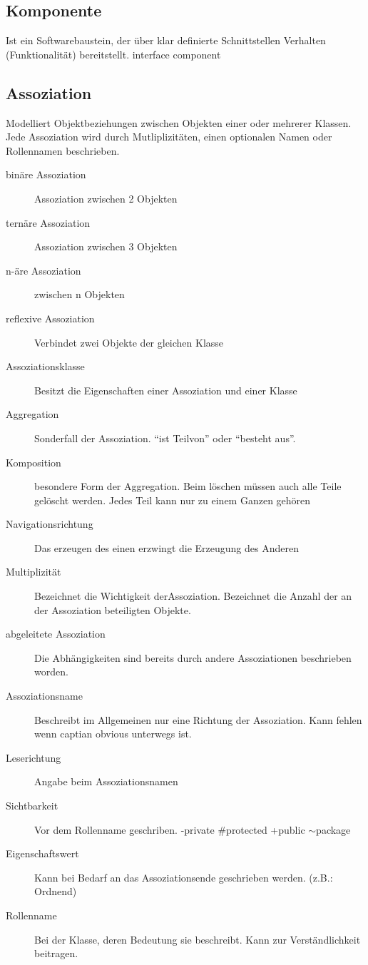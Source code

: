	
\subsection{Komponente}
	Ist ein Softwarebaustein, der über klar definierte Schnittstellen Verhalten
	(Funktionalität) bereitstellt.
	interface
	component

\subsection{Assoziation}
	Modelliert Objektbeziehungen zwischen Objekten einer oder mehrerer Klassen.
	Jede Assoziation wird durch Mutliplizitäten, einen optionalen Namen oder Rollennamen
	beschrieben.
\begin{description}
	\item[binäre Assoziation] Assoziation zwischen 2 Objekten
	\item[ternäre Assoziation] Assoziation zwischen 3 Objekten
	\item[n-äre Assoziation] zwischen n Objekten
	\item[reflexive Assoziation] Verbindet zwei Objekte der gleichen Klasse
	\item[Assoziationsklasse] Besitzt die Eigenschaften einer Assoziation und einer
		Klasse
	\item[Aggregation] Sonderfall der Assoziation. "`ist Teilvon"' oder "`besteht
		aus"'.
	\item[Komposition] besondere Form der Aggregation. Beim löschen müssen auch
		alle Teile gelöscht werden. Jedes Teil kann nur zu einem Ganzen gehören 
	\item[Navigationsrichtung] Das erzeugen des einen erzwingt die Erzeugung des
		Anderen
	\item[Multiplizität] Bezeichnet die Wichtigkeit derAssoziation. Bezeichnet die
		Anzahl der an der Assoziation beteiligten Objekte.
	\item[abgeleitete Assoziation] Die Abhängigkeiten sind bereits durch andere
		Assoziationen beschrieben worden.
	\item[Assoziationsname] Beschreibt im Allgemeinen nur eine Richtung der
		Assoziation. Kann fehlen wenn captian obvious unterwegs ist.
	\item[Leserichtung] Angabe beim Assoziationsnamen
	\item[Sichtbarkeit] Vor dem Rollenname geschriben. -private \#protected +public
		$\sim$package
	\item[Eigenschaftswert] Kann bei Bedarf an das Assoziationsende geschrieben
		werden. (z.B.: Ordnend)
	\item[Rollenname] Bei der Klasse, deren Bedeutung sie beschreibt. Kann zur
		Verständlichkeit beitragen.
\end{description}

